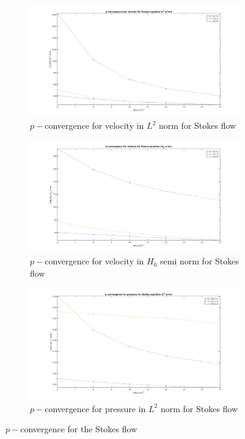 \documentclass[a4paper,twoside,openright]{book}
\begin{document}
\begin{figure}
\begin{subfigure}{\textwidth}
\centering
  \includegraphics[width=0.8\linewidth]{p_conv_velocity_l2_stokes.jpg}
  \caption{$p-$convergence for velocity in $L^2$ norm for Stokes flow}
  \label{p_convergence_velocity_l2}
\end{subfigure}
\begin{subfigure}{\textwidth}
\centering
  \includegraphics[width=0.8\linewidth]{p_conv_velocity_h0_stokes.jpg}
  \caption{$p-$convergence for velocity in $H_0$ semi norm for Stokes flow}
  \label{p_convergence_velocity_h0}
\end{subfigure}
\begin{subfigure}{\textwidth}
\centering
  \includegraphics[width=0.8\linewidth]{p_conv_pressure_l2_stokes.jpg}
  \caption{$p-$convergence for pressure in $L^2$ norm for Stokes flow}
  \label{p_convergence_pressure_l2}
\end{subfigure}
\caption{$p-$convergence for the Stokes flow}
\label{p_conv_stokes_flow}
\end{figure}
\end{document}
